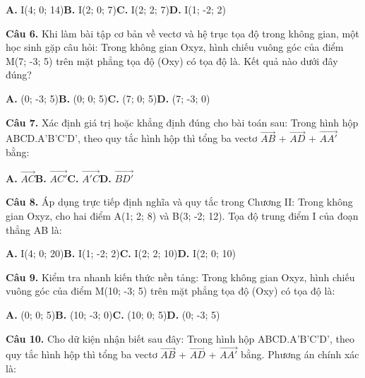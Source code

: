 \documentclass[11pt,a4paper]{article}
\begin{document}
\hspace*{1.5em}\textbf{A.} I(4; 0; 14)\quad\quad \textbf{B.} I(2; 0; 7)\quad\quad \textbf{C.} I(2; 2; 7)\quad\quad \textbf{D.} I(1; -2; 2)\par\vspace{2pt}
\textbf{\color{primary} Câu 6.} Khi làm bài tập cơ bản về vectơ và hệ trục tọa độ trong không gian, một học sinh gặp câu hỏi: Trong không gian Oxyz, hình chiếu vuông góc của điểm M(7; -3; 5) trên mặt phẳng tọa độ (Oxy) có tọa độ là. Kết quả nào dưới đây đúng?\par
\hspace*{1.5em}\textbf{A.} (0; -3; 5)\quad\quad \textbf{B.} (0; 0; 5)\quad\quad \textbf{C.} (7; 0; 5)\quad\quad \textbf{D.} (7; -3; 0)\par\vspace{2pt}
\textbf{\color{primary} Câu 7.} Xác định giá trị hoặc khẳng định đúng cho bài toán sau: Trong hình hộp ABCD.A'B'C'D', theo quy tắc hình hộp thì tổng ba vectơ $\overrightarrow{AB}$ + $\overrightarrow{AD}$ + $\overrightarrow{AA'}$ bằng:\par
\hspace*{1.5em}\textbf{A.} $\overrightarrow{AC}$\quad\quad \textbf{B.} $\overrightarrow{AC'}$\quad\quad \textbf{C.} $\overrightarrow{A'C}$\quad\quad \textbf{D.} $\overrightarrow{BD'}$\par\vspace{2pt}
\textbf{\color{primary} Câu 8.} Áp dụng trực tiếp định nghĩa và quy tắc trong Chương II: Trong không gian Oxyz, cho hai điểm A(1; 2; 8) và B(3; -2; 12). Tọa độ trung điểm I của đoạn thẳng AB là:\par
\hspace*{1.5em}\textbf{A.} I(4; 0; 20)\quad\quad \textbf{B.} I(1; -2; 2)\quad\quad \textbf{C.} I(2; 2; 10)\quad\quad \textbf{D.} I(2; 0; 10)\par\vspace{2pt}
\textbf{\color{primary} Câu 9.} Kiểm tra nhanh kiến thức nền tảng: Trong không gian Oxyz, hình chiếu vuông góc của điểm M(10; -3; 5) trên mặt phẳng tọa độ (Oxy) có tọa độ là:\par
\hspace*{1.5em}\textbf{A.} (0; 0; 5)\quad\quad \textbf{B.} (10; -3; 0)\quad\quad \textbf{C.} (10; 0; 5)\quad\quad \textbf{D.} (0; -3; 5)\par\vspace{2pt}
\textbf{\color{primary} Câu 10.} Cho dữ kiện nhận biết sau đây: Trong hình hộp ABCD.A'B'C'D', theo quy tắc hình hộp thì tổng ba vectơ $\overrightarrow{AB}$ + $\overrightarrow{AD}$ + $\overrightarrow{AA'}$ bằng. Phương án chính xác là:\par
\end{document}
